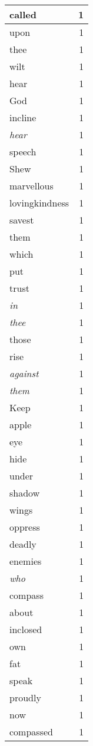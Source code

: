 \begin{center}
\begin{longtable}{l|r}
called & 1\\ \hline 
upon & 1\\ \hline 
thee & 1\\ \hline 
wilt & 1\\ \hline 
hear & 1\\ \hline 
God & 1\\ \hline 
incline & 1\\ \hline 
\emph{hear} & 1\\ \hline 
speech & 1\\ \hline 
Shew & 1\\ \hline 
marvellous & 1\\ \hline 
lovingkindness & 1\\ \hline 
savest & 1\\ \hline 
them & 1\\ \hline 
which & 1\\ \hline 
put & 1\\ \hline 
trust & 1\\ \hline 
\emph{in} & 1\\ \hline 
\emph{thee} & 1\\ \hline 
those & 1\\ \hline 
rise & 1\\ \hline 
\emph{against} & 1\\ \hline 
\emph{them} & 1\\ \hline 
Keep & 1\\ \hline 
apple & 1\\ \hline 
eye & 1\\ \hline 
hide & 1\\ \hline 
under & 1\\ \hline 
shadow & 1\\ \hline 
wings & 1\\ \hline 
oppress & 1\\ \hline 
deadly & 1\\ \hline 
enemies & 1\\ \hline 
\emph{who} & 1\\ \hline 
compass & 1\\ \hline 
about & 1\\ \hline 
inclosed & 1\\ \hline 
own & 1\\ \hline 
fat & 1\\ \hline 
speak & 1\\ \hline 
proudly & 1\\ \hline 
now & 1\\ \hline 
compassed & 1\\ \hline 

\end{longtable}
\end{center}
